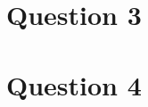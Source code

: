 \documentclass{article}
\begin{document}
\section*{Question 3}
\section*{Question 4}
\end{document}
